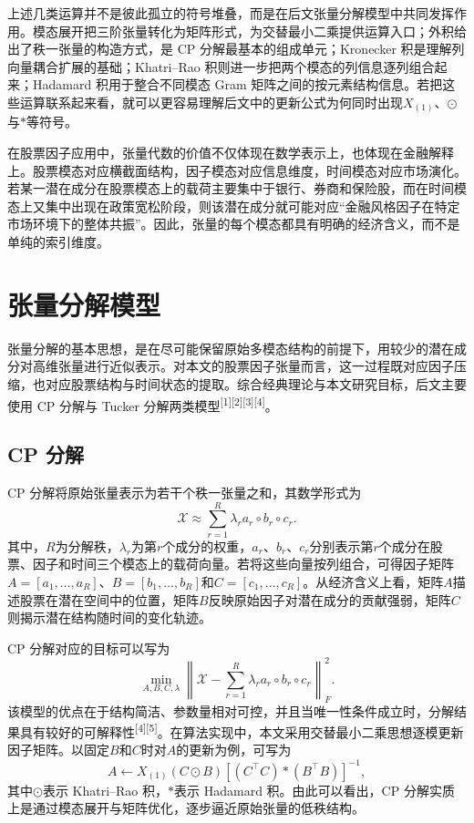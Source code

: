 上述几类运算并不是彼此孤立的符号堆叠，而是在后文张量分解模型中共同发挥作用。模态展开把三阶张量转化为矩阵形式，为交替最小二乘提供运算入口；外积给出了秩一张量的构造方式，是 CP 分解最基本的组成单元；Kronecker 积是理解列向量耦合扩展的基础；Khatri--Rao 积则进一步把两个模态的列信息逐列组合起来；Hadamard 积用于整合不同模态 Gram 矩阵之间的按元素结构信息。若把这些运算联系起来看，就可以更容易理解后文中的更新公式为何同时出现$X_{(1)}$、$\odot$与$\ast$等符号。

在股票因子应用中，张量代数的价值不仅体现在数学表示上，也体现在金融解释上。股票模态对应横截面结构，因子模态对应信息维度，时间模态对应市场演化。若某一潜在成分在股票模态上的载荷主要集中于银行、券商和保险股，而在时间模态上又集中出现在政策宽松阶段，则该潜在成分就可能对应“金融风格因子在特定市场环境下的整体共振”。因此，张量的每个模态都具有明确的经济含义，而不是单纯的索引维度。

\section{张量分解模型}

张量分解的基本思想，是在尽可能保留原始多模态结构的前提下，用较少的潜在成分对高维张量进行近似表示。对本文的股票因子张量而言，这一过程既对应因子压缩，也对应股票结构与时间状态的提取。综合经典理论与本文研究目标，后文主要使用 CP 分解与 Tucker 分解两类模型\textsuperscript{[1][2][3][4]}。

\subsection{CP 分解}

CP 分解将原始张量表示为若干个秩一张量之和，其数学形式为
\begin{equation}
\mathcal{X}\approx \sum_{r=1}^{R}\lambda_r a_r\circ b_r\circ c_r.
\end{equation}
其中，$R$为分解秩，$\lambda_r$为第$r$个成分的权重，$a_r$、$b_r$、$c_r$分别表示第$r$个成分在股票、因子和时间三个模态上的载荷向量。若将这些向量按列组合，可得因子矩阵$A=[a_1,\ldots,a_R]$、$B=[b_1,\ldots,b_R]$和$C=[c_1,\ldots,c_R]$。从经济含义上看，矩阵$A$描述股票在潜在空间中的位置，矩阵$B$反映原始因子对潜在成分的贡献强弱，矩阵$C$则揭示潜在结构随时间的变化轨迹。

CP 分解对应的目标可以写为
\begin{equation}
\min_{A,B,C,\lambda}\left\|\mathcal{X}-\sum_{r=1}^{R}\lambda_r a_r\circ b_r\circ c_r\right\|_F^2.
\end{equation}
该模型的优点在于结构简洁、参数量相对可控，并且当唯一性条件成立时，分解结果具有较好的可解释性\textsuperscript{[4][5]}。在算法实现中，本文采用交替最小二乘思想逐模更新因子矩阵。以固定$B$和$C$时对$A$的更新为例，可写为
\begin{equation}
A\leftarrow X_{(1)}(C\odot B)\left[(C^{\top}C)\ast(B^{\top}B)\right]^{-1},
\end{equation}
其中$\odot$表示 Khatri--Rao 积，$\ast$表示 Hadamard 积。由此可以看出，CP 分解实质上是通过模态展开与矩阵优化，逐步逼近原始张量的低秩结构。

